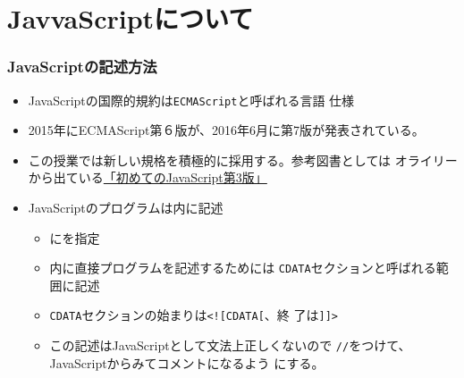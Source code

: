 

\frame{\maketitle}
\section{JavvaScriptについて}
\begin{frame}[containsverbatim]
 \frametitle{JavaScriptの記述方法}
 \begin{itemize}
  \item JavaScriptの国際的規約は\texttt{ECMAScript}と呼ばれる言語
        仕様
	\item 2015年にECMAScript第６版が、2016年6月に第7版が発表されている。
	\item この授業では新しい規格を積極的に採用する。参考図書としては
				オライリーから出ている\href{https://www.amazon.co.jp/%E5%88%9D%E3%82%81%E3%81%A6%E3%81%AEJavaScript-%E7%AC%AC3%E7%89%88-ES2015%E4%BB%A5%E9%99%8D%E3%81%AE%E6%9C%80%E6%96%B0%E3%82%A6%E3%82%A7%E3%83%96%E9%96%8B%E7%99%BA-Ethan-Brown/dp/4873117836/ref=sr_1_1?s=books&ie=UTF8&qid=1493275993&sr=1-1&keywords=%E5%88%9D%E3%82%81%E3%81%A6%E3%81%AEjavascript}{「初めてのJavaScript第3版」}
  \item JavaScriptのプログラムは内に記述
        \begin{itemize}
         \item {}にを指定
         \item {}内に直接プログラムを記述するためには
               \texttt{CDATA}セクションと呼ばれる範囲に記述
         \item \texttt{CDATA}セクションの始まりは\texttt{<![CDATA[}、終
               了は\texttt{]]>}
         \item この記述はJavaScriptとして文法上正しくないので
               \texttt{//}をつけて、JavaScriptからみてコメントになるよう
               にする。
        \end{itemize}
 \end{itemize}
\end{frame}
